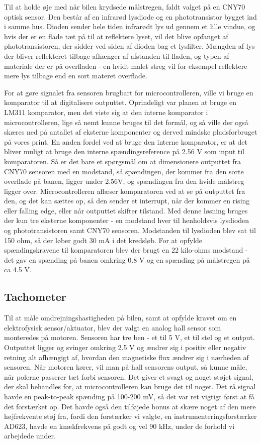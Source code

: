 Til at holde øje med når bilen krydsede målstregen, faldt valget på en CNY70 optisk sensor. Den består af en infrarød lysdiode og en phototransistor bygget ind i samme hus. Dioden sender hele tiden infrarødt lys ud gennem et lille vindue, og hvis der er en flade tæt på til at reflektere lyset, vil det blive opfanget af phototransistoren, der sidder ved siden af dioden bag et lysfilter. Mængden af lys der bliver reflekteret tilbage afhænger af afstanden til fladen, og typen af materiale der er på overfladen - en hvidt malet streg vil for eksempel reflektere mere lys tilbage end en sort materet overflade.

For at gøre signalet fra sensoren brugbart for microcontrolleren, ville vi bruge en komparator til at digitalisere outputtet. Oprindeligt var planen at bruge en LM311 komparator, men det viste sig at den interne komparator i microcontrolleren, lige så nemt kunne bruges til det formål, og så ville der også skæres ned på antallet af eksterne komponenter og derved mindske pladsforbruget på vores print. En anden fordel ved at bruge den interne komparator, er at det bliver muligt at bruge den interne spændingsreference på 2.56 V som input til komparatoren. Så er det bare et spørgsmål om at dimensionere outputtet fra CNY70 sensoren med en modstand, så spændingen, der kommer fra den sorte overflade på banen, ligger under 2.56V, og spændingen fra den hvide målstreg ligger over. Microcontrolleren aflæser komparatoren ved at se på outputtet fra den, og det kan sættes op, så den sender et interrupt, når der kommer en rising eller falling edge, eller når outputtet skifter tilstand. Med denne løsning bruges der kun tre eksterne komponenter - en modstand hver til henholdsvis lysdioden og phototransistoren samt CNY70 sensoren. Modstanden til lysdioden blev sat til 150 ohm, så der løber godt 30 mA i det kredsløb. For at opfylde spændingskravene til komparatoren blev der brugt en 22 kilo-ohms modstand - det gav en spænding på banen omkring 0.8 V og en spænding på målstregen på ca 4.5 V.

\subsection{Tachometer}

Til at måle omdrejningshastigheden på bilen, samt at opfylde kravet om en elektrofysisk sensor/aktuator, blev der valgt en analog hall sensor som monteredes på motoren. Sensoren har tre ben - et til 5 V, et til stel og et output. Outputtet ligger og svinger omkring 2.5 V og ændrer sig i positiv eller negativ retning alt afhængigt af, hvordan den magnetiske flux ændrer sig i nærheden af sensoren. Når motoren kører, vil man på hall sensorens output, så kunne måle, når polerne passerer tæt forbi sensoren. Det giver et svagt og noget støjet signal, der skal behandles for, at microcontrolleren kan bruge det til noget. Det rå signal havde en peak-to-peak spænding på 100-200 mV, så det var ret vigtigt først at få det forstærket op. Det havde også den tilføjede bonus at skære noget af den mere højfrekvente støj fra, fordi den forstærker vi valgte, en instrumenteringsforstærker AD623, havde en knækfrekvens på godt og vel 90 kHz, under de forhold vi arbejdede under. 

